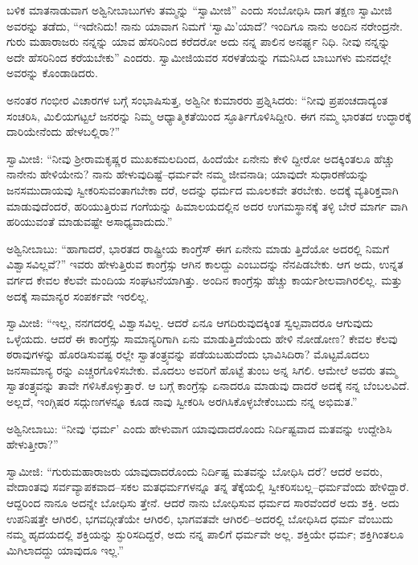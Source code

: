 ಬಳಿಕ ಮಾತನಾಡುವಾಗ ಅಶ್ವಿನೀಬಾಬುಗಳು ತಮ್ಮನ್ನು “ಸ್ವಾಮೀಜಿ” ಎಂದು ಸಂಬೋಧಿಸಿ ದಾಗ ತಕ್ಷಣ ಸ್ವಾಮೀಜಿ ಅವರನ್ನು ತಡೆದು, “ಇದೇನಿದು! ನಾನು ಯಾವಾಗ ನಿಮಗೆ ‘ಸ್ವಾಮಿ’ಯಾದೆ? ಇಂದಿಗೂ ನಾನು ಅಂದಿನ ನರೇಂದ್ರನೇ. ಗುರು ಮಹಾರಾಜರು ನನ್ನನ್ನು ಯಾವ ಹೆಸರಿನಿಂದ ಕರೆದರೋ ಅದು ನನ್ನ ಪಾಲಿನ ಅನರ್ಘ್ಯ ನಿಧಿ. ನೀವು ನನ್ನನ್ನು ಅದೇ ಹೆಸರಿನಿಂದ ಕರೆಯಬೇಕು” ಎಂದರು. ಸ್ವಾಮೀಜಿಯವರ ಸರಳತೆಯನ್ನು ಗಮನಿಸಿದ ಬಾಬುಗಳು ಮನದಲ್ಲೇ ಅವರನ್ನು ಕೊಂಡಾಡಿದರು.

ಅನಂತರ ಗಂಭೀರ ವಿಚಾರಗಳ ಬಗ್ಗೆ ಸಂಭಾಷಿಸುತ್ತ, ಅಶ್ವಿನೀ ಕುಮಾರರು ಪ್ರಶ್ನಿಸಿದರು: “ನೀವು ಪ್ರಪಂಚದಾದ್ಯಂತ ಸಂಚರಿಸಿ, ಮಿಲಿಯಗಟ್ಟಲೆ ಜನರನ್ನು ನಿಮ್ಮ ಆಧ್ಯಾತ್ಮಿಕತೆಯಿಂದ ಸ್ಫೂರ್ತಿಗೊಳಿಸಿದ್ದೀರಿ. ಈಗ ನಮ್ಮ ಭಾರತದ ಉದ್ಧಾರಕ್ಕೆ ದಾರಿಯೇನೆಂದು ಹೇಳಬಲ್ಲಿರಾ?”

ಸ್ವಾಮೀಜಿ: “ನೀವು ಶ್ರೀರಾಮಕೃಷ್ಣರ ಮುಖಕಮಲದಿಂದ, ಹಿಂದೆಯೇ ಏನೇನು ಕೇಳಿ ದ್ದೀರೋ ಅದಕ್ಕಿಂತಲೂ ಹೆಚ್ಚು ನಾನೇನು ಹೇಳಿಯೇನು? ನಾನು ಹೇಳುವುದಿಷ್ಟೆ–ಧರ್ಮವೇ ನಮ್ಮ ಜೀವನಾಡಿ; ಯಾವುದೇ ಸುಧಾರಣೆಯನ್ನು ಜನಸಮುದಾಯವು ಸ್ವೀಕರಿಸುವಂತಾಗಬೇಕಾ ದರೆ, ಅದನ್ನು ಧರ್ಮದ ಮೂಲಕವೇ ತರಬೇಕು. ಅದಕ್ಕೆ ವ್ಯತಿರಿಕ್ತವಾಗಿ ಮಾಡುವುದೆಂದರೆ, ಹರಿಯುತ್ತಿರುವ ಗಂಗೆಯನ್ನು ಹಿಮಾಲಯದಲ್ಲಿನ ಅದರ ಉಗಮಸ್ಥಾನಕ್ಕೆ ತಳ್ಳಿ ಬೇರೆ ಮಾರ್ಗ ವಾಗಿ ಹರಿಯುವಂತೆ ಮಾಡುವಷ್ಟೇ ಅಸಾಧ್ಯವಾದುದು.”

ಅಶ್ವಿನೀಬಾಬು: “ಹಾಗಾದರೆ, ಭಾರತದ ರಾಷ್ಟ್ರೀಯ ಕಾಂಗ್ರೆಸ್ ಈಗ ಏನೇನು ಮಾಡು ತ್ತಿದೆಯೋ ಅದರಲ್ಲಿ ನಿಮಗೆ ವಿಶ್ವಾಸವಿಲ್ಲವೆ?” ಇವರು ಹೇಳುತ್ತಿರುವ ಕಾಂಗ್ರೆಸ್ಸು ಆಗಿನ ಕಾಲದ್ದು ಎಂಬುದನ್ನು ನೆನಪಿಡಬೇಕು. ಆಗ ಅದು, ಉನ್ನತ ವರ್ಗದ ಕೇವಲ ಕೆಲವೇ ಮಂದಿಯ ಸಂಘಟನೆಯಾಗಿತ್ತು. ಅಂದಿನ ಕಾಂಗ್ರೆಸ್ಸು ಹೆಚ್ಚು ಕಾರ್ಯಶೀಲವಾಗಿರಲಿಲ್ಲ. ಮತ್ತು ಅದಕ್ಕೆ ಸಾಮಾನ್ಯರ ಸಂಪರ್ಕವೇ ಇರಲಿಲ್ಲ.

ಸ್ವಾಮೀಜಿ: “ಇಲ್ಲ, ನನಗದರಲ್ಲಿ ವಿಶ್ವಾಸವಿಲ್ಲ. ಆದರೆ ಏನೂ ಆಗದಿರುವುದಕ್ಕಿಂತ ಸ್ವಲ್ಪವಾದರೂ ಆಗುವುದು ಒಳ್ಳೆಯದು. ಆದರೆ ಈ ಕಾಂಗ್ರೆಸ್ಸು ಸಾಮಾನ್ಯರಿಗಾಗಿ ಏನು ಮಾಡುತ್ತಿದೆಯೆಂದು ಹೇಳಿ ನೋಡೋಣ? ಕೇವಲ ಕೆಲವು ಠರಾವುಗಳನ್ನು ಹೊರಡಿಸುವಷ್ಟ ರಲ್ಲೇ ಸ್ವಾತಂತ್ರ್ಯವನ್ನು ಪಡೆಯಬಹುದೆಂದು ಭಾವಿಸಿದಿರಾ? ಮೊಟ್ಟಮೊದಲು ಜನಸಾಮಾನ್ಯ ರನ್ನು ಎಚ್ಚರಗೊಳಿಸಬೇಕು. ಮೊದಲು ಅವರಿಗೆ ಹೊಟ್ಟೆ ತುಂಬ ಅನ್ನ ಸಿಗಲಿ. ಆಮೇಲೆ ಅವರು ತಮ್ಮ ಸ್ವಾತಂತ್ರ್ಯವನ್ನು ತಾವೇ ಗಳಿಸಿಕೊಳ್ಳುತ್ತಾರೆ. ಆ ಬಗ್ಗೆ ಕಾಂಗ್ರೆಸ್ಸು ಏನಾದರೂ ಮಾಡುವು ದಾದರೆ ಅದಕ್ಕೆ ನನ್ನ ಬೆಂಬಲವಿದೆ. ಅಲ್ಲದೆ, ಇಂಗ್ಗಿಷರ ಸದ್ಗುಣಗಳನ್ನೂ ಕೂಡ ನಾವು ಸ್ವೀಕರಿಸಿ ಅರಗಿಸಿಕೊಳ್ಳಬೇಕೆಂಬುದು ನನ್ನ ಅಭಿಮತ.”

ಅಶ್ವಿನೀಬಾಬು: “ನೀವು ‘ಧರ್ಮ’ ಎಂದು ಹೇಳುವಾಗ ಯಾವುದಾದರೊಂದು ನಿರ್ದಿಷ್ಟವಾದ ಮತವನ್ನು ಉದ್ದೇಶಿಸಿ ಹೇಳುತ್ತೀರಾ?”

ಸ್ವಾಮೀಜಿ: “ಗುರುಮಹಾರಾಜರು ಯಾವುದಾದರೊಂದು ನಿರ್ದಿಷ್ಟ ಮತವನ್ನು ಬೋಧಿಸಿ ದರೆ? ಆದರೆ ಅವರು, ವೇದಾಂತವು ಸರ್ವವ್ಯಾಪಕವಾದ–ಸಕಲ ಮತಧರ್ಮಗಳನ್ನೂ ತನ್ನ ತೆಕ್ಕೆಯಲ್ಲಿ ಸ್ವೀಕರಿಸಬಲ್ಲ–ಧರ್ಮವೆಂದು ಹೇಳಿದ್ದಾರೆ. ಆದ್ದರಿಂದ ನಾನೂ ಅದನ್ನೇ ಬೋಧಿಸು ತ್ತೇನೆ. ಆದರೆ ನಾನು ಬೋಧಿಸುವ ಧರ್ಮದ ಸಾರವೆಂದರೆ ಅದು ಶಕ್ತಿ. ಅದು ಉಪನಿಷತ್ತೇ ಆಗಿರಲಿ, ಭಗವದ್ಗೀತೆಯೇ ಆಗಿರಲಿ, ಭಾಗವತವೇ ಆಗಿರಲಿ–ಅದರಲ್ಲಿ ಬೋಧಿಸಿದ ಧರ್ಮ ವೆಂಬುದು ನಮ್ಮ ಹೃದಯದಲ್ಲಿ ಶಕ್ತಿಯನ್ನು ಸ್ಫುರಿಸದಿದ್ದರೆ, ಅದು ನನ್ನ ಪಾಲಿಗೆ ಧರ್ಮವೇ ಅಲ್ಲ. ಶಕ್ತಿಯೇ ಧರ್ಮ; ಶಕ್ತಿಗಿಂತಲೂ ಮಿಗಿಲಾದದ್ದು ಯಾವುದೂ ಇಲ್ಲ.”


